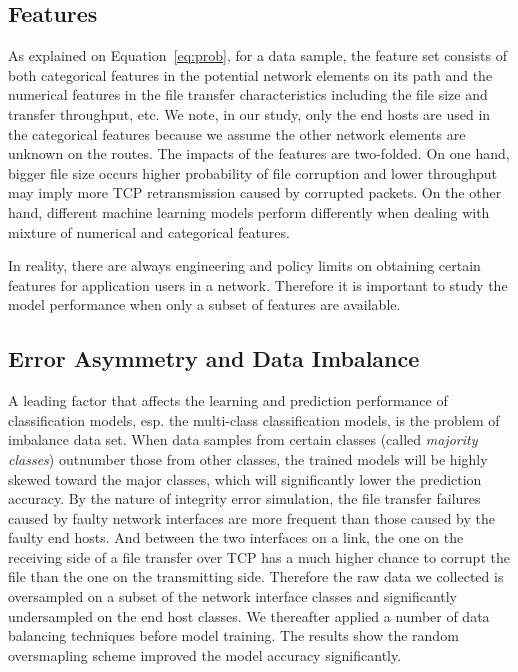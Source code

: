 \subsection{Features}
As explained on Equation~\ref{eq:prob}, for a data sample, the feature set consists of both categorical features in the potential network elements on its path and the numerical features 
in the file transfer characteristics including the file size and transfer throughput, etc. We note, in our study, only the end hosts are used in the categorical features because we assume the other network elements 
are unknown on the routes. The impacts of the features are two-folded. On one hand, bigger file size occurs higher probability of file corruption and lower throughput may imply more TCP retransmission caused by corrupted packets.
On the other hand, different machine learning models perform differently when dealing with mixture of numerical and categorical features.   

In reality, there are always engineering and policy limits on obtaining certain features for application users in a network. Therefore it is important to study the model performance when only a subset of features are available.   

\subsection{Error Asymmetry and Data Imbalance} 
\label{sub:ml:imbalance}
A leading factor that affects the learning and prediction performance of classification models, esp. the multi-class classification models, is the problem of imbalance data set. When data samples from certain classes (called {\it majority classes}) outnumber those from other classes, the trained models will be highly skewed toward the major classes, which will significantly lower the prediction accuracy. By the nature of integrity error simulation, the file transfer failures caused by faulty network interfaces are more frequent than those caused by the faulty end hosts. And between the two interfaces on a link, the one on the receiving side of a file transfer over TCP has a much higher chance to corrupt the file than the one on the transmitting side. Therefore the raw data we collected is oversampled on a subset of the network interface classes and significantly undersampled on the end host classes. We thereafter applied a number of data balancing techniques before model training. The results show the random oversmapling scheme improved the model accuracy significantly.